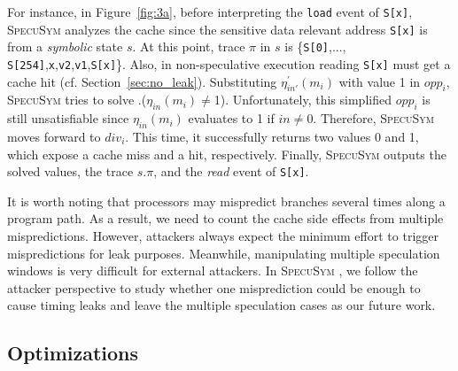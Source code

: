 \documentclass[sigconf]{acmart}
\newcommand{\SpecuSym}{\textsc{SpecuSym} }
\begin{document}
For instance, in Figure~\ref{fig:3a}, before interpreting the \texttt{load} 
event of \texttt{S[x]}, \SpecuSym analyzes the cache since the sensitive 
data relevant address {\texttt{S[x]}} is from a \textit{symbolic} state 
$s$. At this point, trace $\pi$ in $s$ is {\small \{\texttt{S[0]},...,
\texttt{S[254]},\texttt{x},\texttt{v2},\texttt{v1},\texttt{S[x]}\}}. Also,
in non-speculative execution reading {\small\texttt{S[x]}} must get a cache 
hit (cf. Section~\ref{sec:no_leak}). 
Substituting $\mathit{\eta_{in'}^\prime(m_i)}$ with value 1 in $\mathit{opp_i}$, 
\SpecuSym tries to solve  \forall{}.($\mathit{\eta_{in}(m_i)\neq}$1). 
Unfortunately, this simplified $\mathit{opp_i}$ is still unsatisfiable since 
$\mathit{\eta_{in}(m_i)}$ evaluates to 1 if $\mathit{in}$$\neq$0. Therefore, 
\SpecuSym moves forward to $\mathit{div_i}$. This time, it successfully returns 
two values 0 and 1, which expose a cache miss and a hit, respectively. Finally, 
\SpecuSym outputs the solved values, the trace $s.\pi$, and the \textit{read} 
event of {\texttt{S[x]}}.


It is worth noting that processors may mispredict branches several times 
along a program path. As a result, we need to count the cache side effects 
from multiple mispredictions. However, attackers always expect the minimum 
effort to trigger mispredictions for leak purposes. Meanwhile, manipulating 
multiple speculation windows is very difficult for external attackers. In 
\SpecuSym, we follow the attacker perspective to study whether one misprediction 
could be enough to cause timing leaks and leave the multiple speculation cases 
as our future work. 



\subsection{Optimizations}
\label{sec:optimize}
\end{document}
